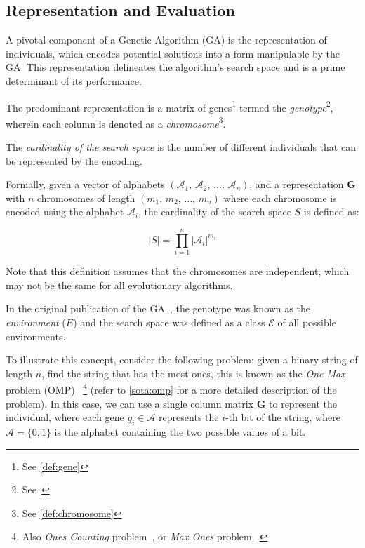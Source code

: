 \subsection{Representation and Evaluation}
\label{sec:bg:ga:repr}
  A pivotal component of a Genetic Algorithm (GA) is the representation of 
  individuals, which encodes potential solutions into a form manipulable by the 
  GA.
  This representation delineates the algorithm's search space and is a prime 
  determinant of its performance.

  The predominant representation is a matrix of genes\footnote{See 
  \vref{def:gene}} termed the \emph{genotype}\footnote{
    See~\autocite{wilhelmstotterJeneticsJavaGenetica}
  }, wherein each column is denoted as a \emph{chromosome}\footnote{
    See \vref{def:chromosome}
  }.

  
  \begin{definition}
  \label{def:cardinality_of_the_search_space}
    The \emph{cardinality of the search space} is the number of different individuals that can be represented by the encoding.

    Formally, given a vector of alphabets \((\mathcal{A}_1,\, \mathcal{A}_2,\, \dots,\, \mathcal{A}_n)\), 
    and a representation \(\mathbf{G}\) with \(n\) chromosomes of length 
    \((m_1,\, m_2,\, \dots,\, m_n)\) where each chromosome is encoded using the
    alphabet \(\mathcal{A}_i\), the cardinality of the search space \(S\) is 
    defined as:
    
    \begin{equation}
      \label{eq:cardinality_of_the_search_space}
      |S| = \prod_{i=1}^n |\mathcal{A}_i|^{m_i}
    \end{equation}

    Note that this definition assumes that the chromosomes are independent, which may not be the 
    same for all evolutionary algorithms.
  \end{definition}

  \begin{remark}
    In the original publication of the GA~\autocite{hollandAdaptationNaturalArtificial1992a},
    the genotype was known as the \emph{environment} (\(E\)) and the search 
    space was defined as a class \(\mathcal{E}\) of all possible environments.
  \end{remark}

  To illustrate this concept, consider the following problem: given a binary 
  string of length \(n\), find the string that has the most ones, this is known 
  as the \emph{One Max} problem (OMP)~\autocite{andonovUnboundedKnapsackProblem2000}
  \footnote{
    Also \emph{Ones Counting} problem~\autocite{wilhelmstotterJeneticsJavaGenetica}, or \emph{Max Ones} problem~\autocite{ECJ}.
  } (refer to \vref{sota:omp} for a more detailed description of the problem).
  In this case, we can use a single column matrix \(\mathbf{G}\) to represent the individual, 
  where each gene \(g_i \in \mathcal{A}\) represents the \(i\)-th bit of the string, where 
  \(\mathcal{A} = \{0, 1\}\) is the alphabet containing the two possible values of a bit.
  
